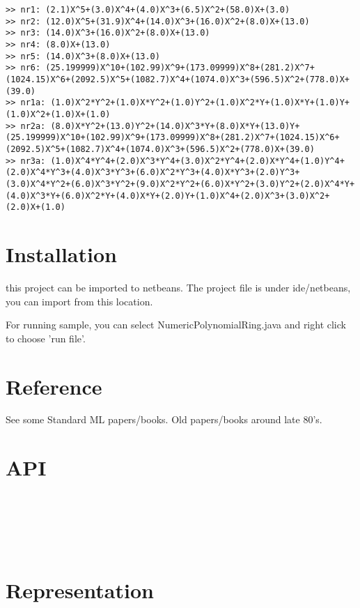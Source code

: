 \documentclass[8pt]{article}
\begin{document}
\begin{lstlisting}
>> nr1: (2.1)X^5+(3.0)X^4+(4.0)X^3+(6.5)X^2+(58.0)X+(3.0)
>> nr2: (12.0)X^5+(31.9)X^4+(14.0)X^3+(16.0)X^2+(8.0)X+(13.0)
>> nr3: (14.0)X^3+(16.0)X^2+(8.0)X+(13.0)
>> nr4: (8.0)X+(13.0)
>> nr5: (14.0)X^3+(8.0)X+(13.0)
>> nr6: (25.199999)X^10+(102.99)X^9+(173.09999)X^8+(281.2)X^7+(1024.15)X^6+(2092.5)X^5+(1082.7)X^4+(1074.0)X^3+(596.5)X^2+(778.0)X+(39.0)
>> nr1a: (1.0)X^2*Y^2+(1.0)X*Y^2+(1.0)Y^2+(1.0)X^2*Y+(1.0)X*Y+(1.0)Y+(1.0)X^2+(1.0)X+(1.0)
>> nr2a: (8.0)X*Y^2+(13.0)Y^2+(14.0)X^3*Y+(8.0)X*Y+(13.0)Y+(25.199999)X^10+(102.99)X^9+(173.09999)X^8+(281.2)X^7+(1024.15)X^6+(2092.5)X^5+(1082.7)X^4+(1074.0)X^3+(596.5)X^2+(778.0)X+(39.0)
>> nr3a: (1.0)X^4*Y^4+(2.0)X^3*Y^4+(3.0)X^2*Y^4+(2.0)X*Y^4+(1.0)Y^4+(2.0)X^4*Y^3+(4.0)X^3*Y^3+(6.0)X^2*Y^3+(4.0)X*Y^3+(2.0)Y^3+(3.0)X^4*Y^2+(6.0)X^3*Y^2+(9.0)X^2*Y^2+(6.0)X*Y^2+(3.0)Y^2+(2.0)X^4*Y+(4.0)X^3*Y+(6.0)X^2*Y+(4.0)X*Y+(2.0)Y+(1.0)X^4+(2.0)X^3+(3.0)X^2+(2.0)X+(1.0)
\end{lstlisting}


\section{Installation}
this project can be imported to netbeans.
The project file is under ide/netbeans, you can import from this location.

For running sample, you can select NumericPolynomialRing.java and right click to choose 'run file'.


\section{Reference}
See some Standard ML papers/books.
Old papers/books around late 80's.

\appendix
\section{API}\\
\\
\\
\\

\section{Representation}\\
\\
\\
\\
\end{document}
